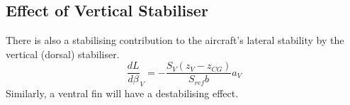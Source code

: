 \subsection{Effect of Vertical Stabiliser}
There is also a stabilising contribution to the aircraft's lateral stability by the vertical (dorsal) stabiliser.
\begin{equation}
  \frac{dL}{d\beta}_V = - \frac{S_V(z_V - z_{CG})}{S_{ref}b}a_V
\end{equation}
Similarly, a ventral fin will have a destabilising effect.
